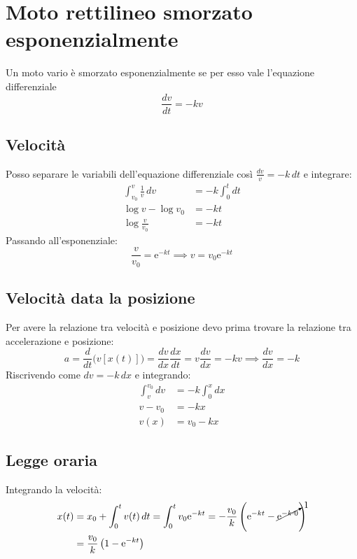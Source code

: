 \documentclass{report}
\newcommand{\me}{\mathrm{e}}
\begin{document}
\section{Moto rettilineo smorzato esponenzialmente}
Un moto vario è smorzato esponenzialmente se per esso vale l'equazione differenziale
\begin{equation*}
    \frac{dv}{dt} = -kv
\end{equation*}
\subsection{Velocità}
Posso separare le variabili dell'equazione differenziale così \(\frac{dv}{v} = -k\,dt\) e integrare:
\begin{align*}
    \int_{v_0}^{v}\frac{1}{v}\,dv & = -k \int_{0}^{t}dt \\
    \log v - \log v_0 & = -kt \\
    \log\frac{v}{v_0} & = -kt
\end{align*}
Passando all'esponenziale:
\begin{equation*}
    \frac{v}{v_0} = \me^{-kt} \implies v = v_0 \me^{-kt}
\end{equation*}
\subsection{Velocità data la posizione}
Per avere la relazione tra velocità e posizione devo prima trovare la 
relazione tra accelerazione e posizione:
\begin{equation*}
    a = \frac{d}{dt}\biggl(v[x(t)]\biggr) = \frac{dv}{dx}\frac{dx}{dt} = v\frac{dv}{dx} = -kv \implies \frac{dv}{dx} = -k
\end{equation*}
Riscrivendo come \(dv = -k\,dx\) e integrando:
\begin{align*}
    \int_{v}^{v_0}dv & = -k\int_{0}^{x}dx \\
    v - v_0 & = -kx \\
    v(x) & = v_0 - kx
\end{align*}
\subsection{Legge oraria}
Integrando la velocità:
\begin{align*}
    x(t) & = x_0 + \int_{0}^{t}v(t)\,dt = \int_{0}^{t}v_0 \me^{-kt} 
    = -\frac{v_0}{k}\left(\me^{-kt} - \cancelto{1}{\me^{-k\cdot 0}}\right) \\
    & = \frac{v_0}{k}\left(1-\me^{-kt}\right)
\end{align*}
\end{document}
